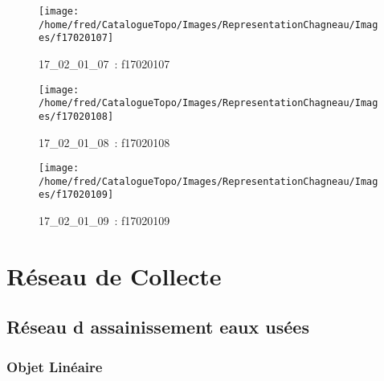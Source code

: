 \documentclass[12pt,titlepage]{book}
\begin{document}
\begin{figure}[h!]
\begin{minipage}[t]{3cm}
    \begin{center}
      \texttt{[image: /home/fred/CatalogueTopo/Images/RepresentationChagneau/Images/f17020107]}
      \caption[~17\_02\_01\_07]{\small{17\_02\_01\_07~:} \tiny{f17020107}}\label{f17020107}
    \end{center}
  \end{minipage}
  \begin{minipage}[t]{3cm}
    \begin{center}
      \texttt{[image: /home/fred/CatalogueTopo/Images/RepresentationChagneau/Images/f17020108]}
      \caption[~17\_02\_01\_08]{\small{17\_02\_01\_08~:} \tiny{f17020108}}\label{f17020108}
    \end{center}
  \end{minipage}
  \begin{minipage}[t]{3cm}
    \begin{center}
      \texttt{[image: /home/fred/CatalogueTopo/Images/RepresentationChagneau/Images/f17020109]}
      \caption[~17\_02\_01\_09]{\small{17\_02\_01\_09~:} \tiny{f17020109}}\label{f17020109}
    \end{center}
  \end{minipage}
\end{figure}
\chapter{Réseau de Collecte}
\section{\large Réseau d assainissement eaux usées}
\subsection{Objet Linéaire}
\noindent
\vspace{\baselineskip}
\end{document}
